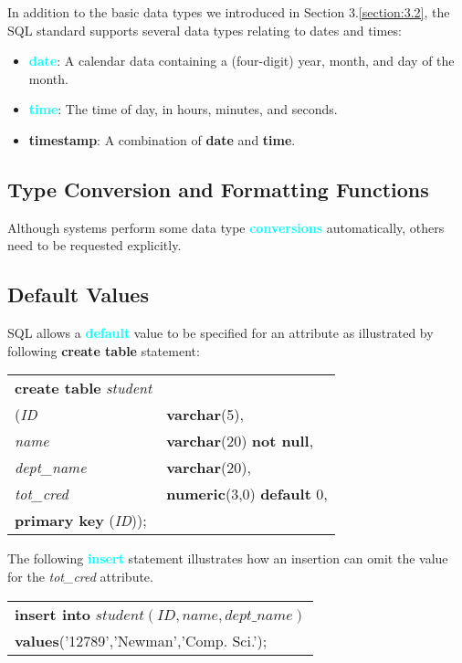 \documentclass[a4paper,12pt,twoside,openany]{book}
\newcommand{\textcy}[1]{\textbf{\textcolor{cyan}{#1}}}
\begin{document}
In addition to the basic data types we introduced in Section 3.\ref{section:3.2}, the SQL standard supports several data types relating to dates and times:
\begin{itemize}
    \item \textcy{date}: A calendar data containing a (four-digit) year, month, and day of the month.
    \item \textcy{time}: The time of day, in hours, minutes, and seconds.
    \item \textbf{timestamp}: A combination of \textbf{date} and \textbf{time}.
\end{itemize}

\subsection{Type Conversion and Formatting Functions}

Although systems perform some data type \textcy{conversions} automatically, others need to be requested explicitly.

\subsection{Default Values}

SQL allows a \textcy{default} value to be specified for an attribute as illustrated by following \textbf{create table} statement:
\begin{center}
    \begin{tabular}{ll}
        \textbf{create table} \textit{student}\\
        \qquad (\textit{ID}&\textbf{varchar}(5),\\
        \qquad \textit{name}&\textbf{varchar}(20) \textbf{not null},\\
        \qquad \textit{dept\_name}&\textbf{varchar}(20),\\
        \qquad \textit{tot\_cred}&\textbf{numeric}(3,0) \textbf{default} 0,\\
        \qquad \textbf{primary key} (\textit{ID}));
    \end{tabular}
\end{center}

The following \textcy{insert} statement illustrates how an insertion can omit the value for the \textit{tot\_cred} attribute.
\begin{center}
    \begin{tabular}{l}
        \textbf{insert into} $student(ID,name,dept\_name)$\\
        \qquad\textbf{values}('12789','Newman','Comp. Sci.');
    \end{tabular}
\end{center}
\end{document}
